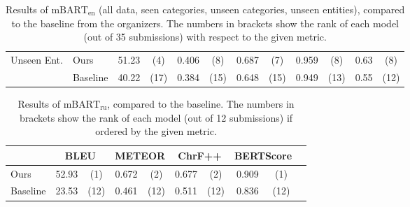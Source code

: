 \documentclass[12pt,notitlepage,a4paper,oneside,openany]{report}
\begin{document}
\begin{table}[t]
\begin{tabular}{llcccccccccc}
        \multirow{2}{*}{Unseen Ent.} & Ours     & 51.23                        & (4)                            & 0.406                          & (8)                               & 0.687                          & (7)  & 0.959 & (8)  & 0.63 & (8)  \\
                                     & Baseline & 40.22                        & (17)                           & 0.384                          & (15)                              & 0.648                          & (15) & 0.949 & (13) & 0.55 & (12) \\\bottomrule
    \end{tabular}
    \caption[Results of our English model compared to the baseline.]{Results of $\text{mBART}_{\text{en}}$ (all data, seen categories, unseen categories, unseen entities), compared to the baseline from the organizers. The numbers in brackets show the rank of each model (out of 35 submissions) with respect to the given metric.}
    \label{tab:mbart:results-en}
\end{table}
\begin{table}[t]
    \footnotesize\centering
    \begin{tabular}{llcccccccc}\toprule
                 & \multicolumn{2}{c}{\bf BLEU} & \multicolumn{2}{c}{\bf METEOR} & \multicolumn{2}{c}{\bf ChrF++} & \multicolumn{2}{c}{\bf BERTScore}                               \\\midrule
        Ours     & 52.93                        & (1)                            & 0.672                          & (2)                               & 0.677 & (2)  & 0.909 & (1)  \\
        Baseline & 23.53                        & (12)                           & 0.461                          & (12)                              & 0.511 & (12) & 0.836 & (12) \\\bottomrule
    \end{tabular}
    \caption[Results of our Russian model compared to the baseline.]{Results of $\text{mBART}_{\text{ru}}$, compared to the baseline. The numbers in brackets show the rank of each model (out of 12 submissions) if ordered by the given metric.}
    \label{tab:mbart:results-ru}
\end{table}


\end{document}
